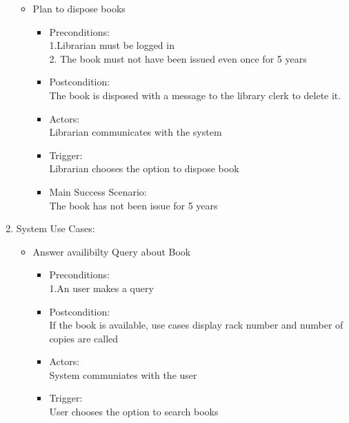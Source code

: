 \documentclass[a4paper]{article}
\begin{document}
\begin{enumerate}
\begin{itemize}
\item Plan to dispose books\\ 
 \begin{itemize}
  \item Preconditions:\\ 1.Librarian must be logged in\\ 2. The book must not have been issued even once for 5 years\\ 
 \item Postcondition:\\ The book is disposed with a message to the library clerk to delete it.\\ 
 \item Actors:\\  Librarian communicates with the system\\ 
 \item Trigger:\\  Librarian  chooses the option to dispose book\\ 
 \item Main Success Scenario:\\  The book has not been issue for 5 years\\ 
 \end{itemize}
 

\end{itemize}

\item System Use Cases:\\ 
 \begin{itemize}
 
  \item Answer availibilty Query about Book\\ 
	\begin{itemize}
	\item  Preconditions:\\ 1.An user makes a query\\ 
 \item Postcondition: \\ If the book is available, use cases display rack number and number of copies are called\\ 
 \item Actors:\\  System communiates with the user\\ 
 \item Trigger: \\ User chooses the option to search books\\ 
	\end{itemize}


\end{itemize}
\end{enumerate}
\end{document}
